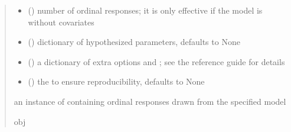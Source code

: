 \documentclass[letterpaper,10pt,english]{sphinxmanual}
\begin{document}
\begin{fulllineitems}
\begin{quote}
\begin{description}
\begin{itemize}
\item {} 
\sphinxAtStartPar
{} () \textendash{} number of ordinal responses; it is only effective if the model
is without covariates

\item {} 
\sphinxAtStartPar
{} (\sphinxstyleliteralemphasis{\sphinxupquote{, }}) \textendash{} dictionary of hypothesized parameters, defaults to None

\item {} 
\sphinxAtStartPar
{} () \textendash{} a dictionary of extra options  and ; see the reference
guide for details

\item {} 
\sphinxAtStartPar
{} (\sphinxstyleliteralemphasis{\sphinxupquote{, }}) \textendash{} the  to ensure reproducibility, defaults to None

\end{itemize}

\sphinxAtStartPar
an instance of  containing ordinal responses drawn from the specified model

\sphinxAtStartPar
obj

\end{description}\end{quote}

\end{fulllineitems}

\end{document}
